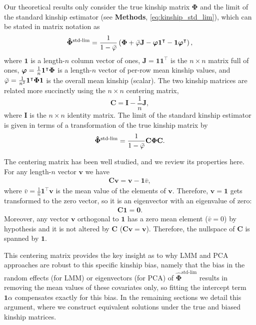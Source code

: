 \documentclass[11pt]{article}
\newcommand{\kinMat}{%
  \ensuremath{%
    \mathbf{\Phi}
  }%
  \xspace%
}%
\newcommand{\kinMatStdLim}{%
  \ensuremath{%
    \mathbf{\hat{\Phi}}^\text{std-lim}
  }%
  \xspace%
}%
\begin{document}
Our theoretical results only consider the true kinship matrix \kinMat and the limit of the standard kinship estimator (see \textbf{Methods}, \cref{eq:kinship_std_lim}), which can be stated in matrix notation as
$$
\kinMatStdLim
=
\frac{1}{1 - \bar{\varphi}}
\left(
  \kinMat
  + \bar{\varphi} \mathbf{J}
  - \boldsymbol{\varphi} \mathbf{1}^\intercal 
  - \mathbf{1} \boldsymbol{\varphi}^\intercal 
\right)
,
$$
where
$\mathbf{1}$ is a length-$n$ column vector of ones,
$\mathbf{J} = \mathbf{1} \mathbf{1}^\intercal$ is the $n \times n$ matrix full of ones,
$\boldsymbol{\varphi} = \frac{1}{n} \mathbf{1}^\intercal \kinMat$ is a length-$n$ vector of per-row mean kinship values, and
$\bar{\varphi} = \frac{1}{n^2} \mathbf{1}^\intercal \kinMat \mathbf{1}$ is the overall mean kinship (scalar).
The two kinship matrices are related more succinctly using the $n \times n$ centering matrix,
$$
\mathbf{C}
=
\mathbf{I} - \frac{1}{n} \mathbf{J},
$$
where $\mathbf{I}$ is the $n \times n$ identity matrix.
The limit of the standard kinship estimator is given in terms of a transformation of the true kinship matrix by
\begin{equation}
  \label{eq:kin-std-lim-C}
  \kinMatStdLim
  =
  \frac{1}{1 - \bar{\varphi}}
  \mathbf{C} \kinMat \mathbf{C}
  .
\end{equation}

The centering matrix has been well studied, and we review its properties here.
For any length-$n$ vector $\mathbf{v}$ we have
\begin{align*}
  \mathbf{C} \mathbf{v}
  =
  \mathbf{v} - \mathbf{1} \bar{v}
  ,
\end{align*}
where $\bar{v} = \frac{1}{n} \mathbf{1}^\intercal \mathbf{v}$ is the mean value of the elements of $\mathbf{v}$.
Therefore, $\mathbf{v} = \mathbf{1}$ gets transformed to the zero vector, so it is an eigenvector with an eigenvalue of zero:
\begin{align*}
  \mathbf{C} \mathbf{1}
  =
  \mathbf{0}
  .
\end{align*}
Moreover, any vector $\mathbf{v}$ orthogonal to $\mathbf{1}$ has a zero mean element ($\bar{v} = 0$) by hypothesis and it is not altered by $\mathbf{C}$ ($\mathbf{C} \mathbf{v} = \mathbf{v}$).
Therefore, the nullspace of $\mathbf{C}$ is spanned by $\mathbf{1}$.

This centering matrix provides the key insight as to why LMM and PCA approaches are robust to this specific kinship bias, namely that the bias in the random effects (for LMM) or eigenvectors (for PCA) of \kinMatStdLim results in removing the mean values of these covariates only, so fitting the intercept term $\mathbf{1} \alpha$ compensates exactly for this bias.
In the remaining sections we detail this argument, where we construct equivalent solutions under the true and biased kinship matrices.
\end{document}
